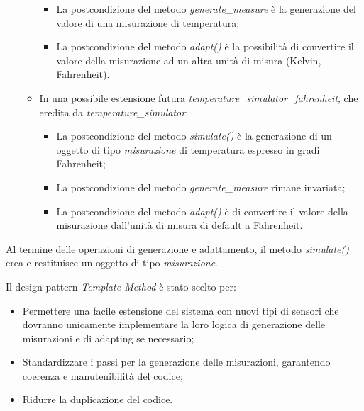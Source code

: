 \begin{itemize}
\begin{itemize}
\begin{itemize}
            \item La postcondizione del metodo \textit{generate\_measure} è la generazione del valore di una misurazione di temperatura;
            
            \item La postcondizione del metodo \textit{adapt()} è la possibilità di convertire il valore della misurazione ad un altra unità di misura (Kelvin, Fahrenheit).
        \end{itemize}

        \item In una possibile estensione futura \textit{temperature\_simulator\_fahrenheit}, che eredita da \textit{temperature\_simulator}:
        \begin{itemize}
            \item La postcondizione del metodo \textit{simulate()} è la generazione di un oggetto di tipo \textit{misurazione} di temperatura espresso in gradi Fahrenheit;
            
            \item La postcondizione del metodo \textit{generate\_measure} rimane invariata;
            
            \item La postcondizione del metodo \textit{adapt()} è di convertire il valore della misurazione dall'unità di misura di default a Fahrenheit.
        \end{itemize}
    \end{itemize}
\end{itemize}

Al termine delle operazioni di generazione e adattamento, il metodo \textit{simulate()} crea e restituisce un oggetto di tipo \textit{misurazione}.

Il design pattern \textit{Template Method} è stato scelto per:
\begin{itemize}
    \item Permettere una facile estensione del sistema con nuovi tipi di sensori che dovranno unicamente implementare la loro logica di generazione delle misurazioni e di adapting se necessario;
    
    \item Standardizzare i passi per la generazione delle misurazioni, garantendo coerenza e manutenibilità del codice;
    
    \item Ridurre la duplicazione del codice.
\end{itemize}

